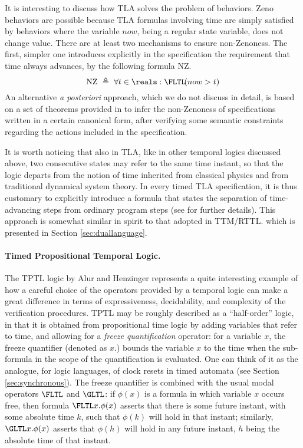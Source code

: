 It is interesting to discuss how TLA solves the problem of  
behaviors. Zeno behaviors are possible because TLA formulas involving 
time are simply satisfied by behaviors where the variable $now$, 
being a regular state variable, does not change value. There 
are at least two mechanisms to ensure non-Zenoness. The first, 
simpler one introduces explicitly in the specification the requirement 
that time always advances, by the following formula $\mathrm{NZ}$. 
  \begin{equation*}
	 \mathrm{NZ} \ \triangleq \ \forall t \in \reals: \FLTL\!(now > t)
  \end{equation*}
  An alternative \emph{a posteriori} approach, which we do not discuss
  in detail, is based on a set of theorems provided in \cite{AL94} to
  infer the non-Zenoness of specifications written in a certain
  canonical form, after verifying some semantic constraints regarding
  the actions included in the specification.

It is worth noticing that also in TLA, like in other temporal 
logics discussed above, two consecutive states may refer to the 
same time instant, so that the logic departs from the notion 
of time inherited from classical physics and from traditional 
dynamical system theory. In every timed TLA specification, it 
is thus customary to explicitly introduce a formula that states 
the separation of time-advancing steps from ordinary program 
steps (see \cite{AL94} for further details). This 
approach is somewhat similar in spirit to that adopted in TTM/RTTL. which is presented in Section \ref{sec:duallanguage}.


\paragraph{Timed Propositional Temporal Logic.}
The TPTL logic by Alur and Henzinger represents a quite interesting 
example of how a careful choice of the operators provided by 
a temporal logic can make a great difference in terms of expressiveness, 
decidability, and complexity of the verification procedures. 
TPTL may be roughly described as a ``half-order'' logic, in that 
it is obtained from propositional  time logic by adding 
variables that refer to time, and allowing for a \emph{freeze quantification} 
operator: for a variable $x$, the freeze quantifier (denoted 
as $x.$) bounds the variable $x$ to the time when the sub-formula in 
the scope of the quantification is evaluated. One can think of 
it as the analogue, for logic languages, of clock resets in timed 
automata (see Section \ref{sec:synchronous}). The freeze quantifier is combined 
with the usual modal operators $\FLTL$ and $\GLTL$: if $\phi(x)$
is a formula in which variable $x$ occurs free, then formula $\FLTL x. \phi(x)$
asserts that there is some future instant, with some absolute 
time $k$, such that $\phi(k)$ will hold in that instant; 
similarly, $\GLTL x. \phi(x)$ asserts that $\phi(h)$
will hold in any future instant, $h$ being the absolute time 
of that instant.

